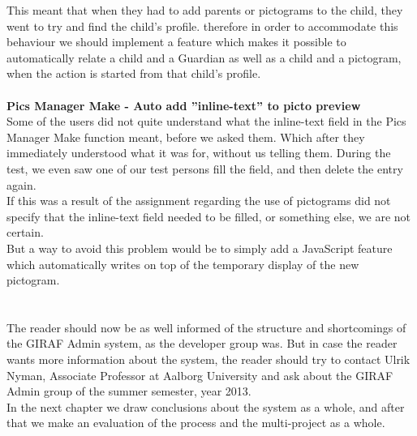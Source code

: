 This meant that when they had to add parents or pictograms to the child, they went to try and find the child's profile. therefore in order to accommodate this behaviour we should implement a feature which makes it possible to automatically relate a child and a Guardian as well as a child and a pictogram, when the action is started from that child's profile.\\
\\
\textbf{Pics Manager Make - Auto add ''inline-text'' to picto preview}\\
Some of the users did not quite understand what the inline-text field in the Pics Manager Make function meant, before we asked them. Which after they immediately understood what it was for, without us telling them. During the test, we even saw one of our test persons fill the field, and then delete the entry again.\\
If this was a result of the assignment regarding the use of pictograms did not specify that the inline-text field needed to be filled, or something else, we are not certain.\\
But a way to avoid this problem would be to simply add a JavaScript feature which automatically writes on top of the temporary display of the new pictogram.\\
\\
\\
The reader should now be as well informed of the structure and shortcomings of the GIRAF Admin system, as the developer group was. But in case the reader wants more information about the system, the reader should try to contact Ulrik Nyman, Associate Professor at Aalborg University and ask about the GIRAF Admin group of the summer semester, year 2013.\\
In the next chapter we draw conclusions about the system as a whole, and after that we make an evaluation of the process and the multi-project as a whole.


